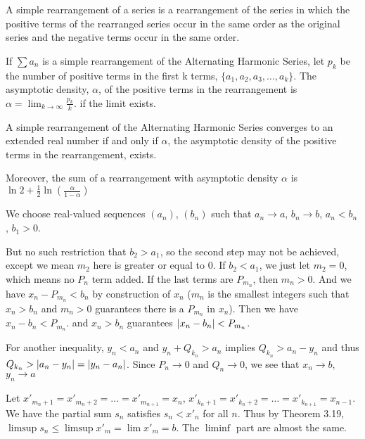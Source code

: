 \begin{note}
    \begin{definition}
        A simple rearrangement of a series is a rearrangement of the series in which the positive terms of the rearranged series occur in the same order as the original series and the negative terms occur in the same order. 
        \end{definition}
    \begin{definition}
        If $\sum a_n$ is a simple rearrangement of the Alternating Harmonic Series, let $p_k$ be the number of positive terms in the first k terms, $\{a_1, a_2, a_3,\dots,a_k\}$. The asymptotic density, $\alpha$, of the positive terms in the rearrangement is $\alpha = \lim_{k\to \infty} \frac{p_k}{k}$.
if the limit exists.
    \end{definition}
    \begin{theorem}
        A simple rearrangement of the Alternating Harmonic Series converges to an extended real number if and only if $\alpha$, the asymptotic density of the positive terms in the rearrangement, exists.\par 
Moreover, the sum of a rearrangement with asymptotic density $\alpha$ is $\ln 2+\frac{1}{2}\ln (\frac{\alpha}{1-\alpha})$
    \end{theorem}
\end{note}
\begin{note}
    We choose real-valued sequences $(a_n)$, $(b_n)$ such that $a_n\to a$, $b_n\to b$, $a_n<b_n$, $b_1>0$.\par
    But no such restriction that $b_2>a_1$, so the second step may not be achieved, except we mean $m_2$ here is greater or equal to 0. If $b_2<a_1$, we just let $m_2=0$, which means no $P_n$ term added. If the last terms are $P_{m_n}$, then $m_n>0$. And we have $x_n-P_{m_n}<b_n$ by construction of $x_n$ ($m_n$ is the smallest integers such that $x_n>b_n$ and $m_n>0$ guarantees there is a $P_{m_n}$ in $x_n$). Then we have $x_n-b_n<P_{m_n}$. and $x_n>b_n$ guarantees $\left\lvert x_n-b_n\right\rvert<P_{m_n}$.\par
    For another inequality, $y_n<a_n$ and $y_n+Q_{k_n}>a_n$ implies $Q_{k_n}>a_n-y_n$ and thus $Q_{k_n}>\left\lvert a_n-y_n\right\rvert=\left\lvert y_n-a_n\right\rvert$. Since $P_n\to 0$ and $Q_n \to 0$, we see that $x_n\to b$, $y_n\to a$\par
    Let $x'_{m_n+1}=x'_{m_n+2}=\dots=x'_{m_{n+1}}=x_n$, $x'_{k_n+1}=x'_{k_n+2}=\dots=x'_{k_{n+1}}=x_{n-1}$. We have the partial sum $s_n$ satisfies $s_n<x'_n$ for all $n$. Thus by Theorem 3.19, $\limsup s_n\leq \limsup x'_m=\lim x'_m=b$. The $\liminf$ part are almost the same.
\end{note}
% 